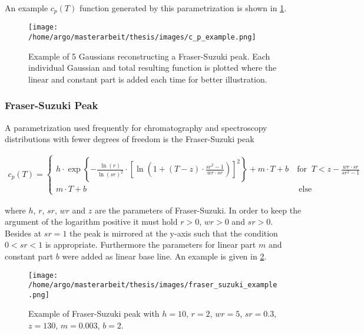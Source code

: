 \documentclass{scrartcl}[12pt, halfparskip]
\numberwithin{equation}{section}
\numberwithin{figure}{section}
\numberwithin{table}{section}
\begin{document}
An example $c_p(T)$ function generated by this parametrization is shown in \cref{fig:parametrization_example_linear_comb_gauss}.


\begin{figure}[H]
	\centering
	\texttt{[image: /home/argo/masterarbeit/thesis/images/c\_p\_example.png]}
	\caption{Example of 5 Gaussians reconstructing a Fraser-Suzuki peak. Each individual Gaussian and total resulting function is plotted where the linear and constant part is added each time for better illustration.}
	\label{fig:parametrization_example_linear_comb_gauss}
\end{figure}



\subsubsection{Fraser-Suzuki Peak}
\label{sec:parametrization_FS}

A parametrization used frequently for chromatography and spectroscopy distributions with fewer degrees of freedom is the Fraser-Suzuki peak \cite{fraser_suzuki_1} \cite{fraser_suzuki_many_fcts}

\begin{align}
	c_p(T) =
	\begin{cases}
		h \cdot \exp \left\{ - \frac{\ln(r)}{\ln(sr)^2} \cdot \left[ \ln\left( 1 + (T-z) \cdot \frac{sr^2 - 1}{wr \cdot sr} \right) \right]^2 \right\} + m \cdot T + b \ & \text{for } \ T < z - \frac{wr \cdot sr}{sr^2 - 1} \\
		m \cdot T + b \ & \ \text{else}
	\end{cases}
	\label{eq:fraser_suzuki}
\end{align}

where $h$, $r$, $sr$, $wr$ and $z$ are the parameters of Fraser-Suzuki. In order to keep the argument of the logarithm positive it must hold $r > 0$, $wr > 0$ and $sr > 0$. Besides at $sr = 1$ the peak is mirrored at the y-axis such that the condition $0 < sr < 1$ is appropriate. Furthermore the parameters for linear part $m$ and constant part $b$ were added as linear base line. An example is given in \cref{fig:parametrization_example_fraser_suzuki}.

\begin{figure}[H]
	\centering
	\texttt{[image: /home/argo/masterarbeit/thesis/images/fraser\_suzuki\_example.png]}
	\caption{Example of Fraser-Suzuki peak with $h=10$, $r=2$, $wr=5$, $sr=0.3$, $z=130$, $m=0.003$, $b=2$.}
	\label{fig:parametrization_example_fraser_suzuki}
\end{figure}
\end{document}
